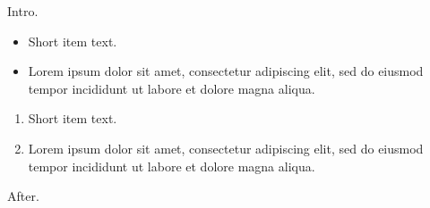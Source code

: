 \documentclass[10pt]{article}
\begin{document}
Intro.
\begin{itemize}
\item Short item text.
\item Lorem ipsum dolor sit amet, consectetur adipiscing elit, sed do eiusmod tempor incididunt ut labore et dolore magna aliqua.
\end{itemize}
\begin{enumerate}
\item Short item text.
\item Lorem ipsum dolor sit amet, consectetur adipiscing elit, sed do eiusmod tempor incididunt ut labore et dolore magna aliqua.
\end{enumerate}
After.
\end{document}
